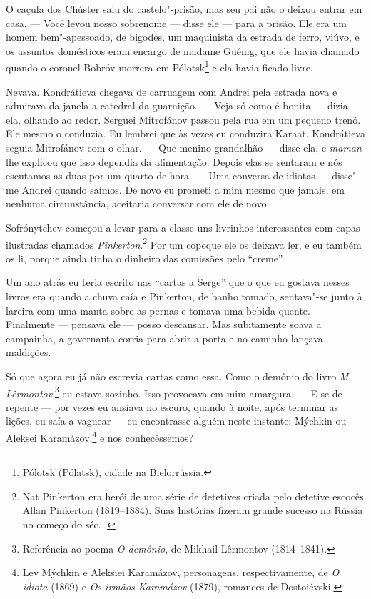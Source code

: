 O caçula dos Chúster saiu do castelo"-prisão, mas seu pai não o deixou
entrar em casa. --- Você levou nosso sobrenome --- disse ele --- para a
prisão. Ele era um homem bem"-apessoado, de bigodes, um maquinista da
estrada de ferro, viúvo, e os assuntos domésticos eram encargo de madame
Guénig, que ele havia chamado quando o coronel Bobróv morrera em
Pólotsk\footnote{Pólotsk (Pólatsk), cidade na Bielorrússia.} e ela havia
ficado livre.

Nevava. Kondrátieva chegava de carruagem com Andrei pela estrada nova e
admirava da janela a catedral da guarnição. --- Veja só como é bonita
--- dizia ela, olhando ao redor. Serguei Mitrofánov passou pela rua em
um pequeno trenó. Ele mesmo o conduzia. Eu lembrei que às vezes eu
conduzira Karaat. Kondrátieva seguia Mitrofánov com o olhar. --- Que
menino grandalhão --- disse ela, e \emph{maman} lhe explicou que isso
dependia da alimentação. Depois elas se sentaram e nós escutamos as duas
por um quarto de hora. --- Uma conversa de idiotas --- disse"-me Andrei
quando saímos. De novo eu prometi a mim mesmo que jamais, em nenhuma
circunstância, aceitaria conversar com ele de novo.

Sofrónytchev começou a levar para a classe uns livrinhos interessantes
com capas ilustradas chamados \emph{Pinkerton}.\footnote{Nat Pinkerton
  era herói de uma série de detetives criada pelo detetive escocês Allan
  Pinkerton (1819--1884). Suas histórias fizeram grande sucesso na
  Rússia no começo do séc. \scalebox{.8}{XX}.} Por um copeque ele os deixava ler, e eu
também os li, porque ainda tinha o dinheiro das comissões pelo
``creme''.

Um ano atrás eu teria escrito nas ``cartas a Serge'' que o que eu
gostava nesses livros era quando a chuva caía e Pinkerton, de banho
tomado, sentava"-se junto à lareira com uma manta sobre as pernas e
tomava uma bebida quente. --- Finalmente --- pensava ele --- posso
descansar. Mas subitamente soava a campainha, a governanta corria para
abrir a porta e no caminho lançava maldições.

Só que agora eu já não escrevia cartas como essa. Como o demônio do
livro \emph{M. Lêrmontov},\footnote{Referência ao poema \emph{O %
  demônio}, de Mikhail Lêrmontov (1814--1841).} eu estava sozinho. Isso
provocava em mim amargura. --- E se de repente --- por vezes eu ansiava
no escuro, quando à noite, após terminar as lições, eu saía a vaguear
--- eu encontrasse alguém neste instante: Mýchkin ou Aleksei
Karamázov,\footnote{Lev Mýchkin e Aleksiei Karamázov, personagens,
  respectivamente, de \emph{O idiota} (1869) e \emph{Os irmãos
  Karamázov} (1879), romances de Dostoiévski.} e nos
conhecêssemos?

